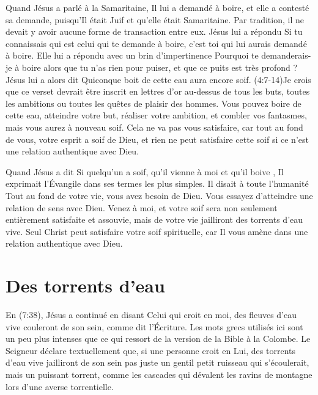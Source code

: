 Quand Jésus a parlé à la Samaritaine, Il lui a demandé à boire,
 et elle a contesté sa demande, puisqu'Il était Juif
 et qu'elle était Samaritaine. Par tradition, il ne devait y avoir
 aucune forme de transaction entre eux. Jésus lui a répondu\frcolon{}
 \Og Si tu connaissais qui est celui qui te demande à boire,
 c'est toi qui lui aurais demandé à boire. \Fg{}
 Elle lui a répondu avec un brin d'impertinence\frcolon{}
 \Og Pourquoi te demanderais-je à boire alors que tu n'as rien pour puiser,
 et que ce puits est très profond ? \Fg{} Jésus lui a alors dit\frcolon{}
 \Og Quiconque boit de cette eau aura encore soif. \Fg{}
 (4:7-14)Je crois que ce verset devrait être inscrit
 en lettres d'or au-dessus de tous les buts, toutes les
 ambitions ou toutes les quêtes de plaisir des hommes.
 Vous pouvez boire de cette eau, atteindre votre but, réaliser votre ambition,
 et combler vos fantasmes, mais vous aurez à nouveau soif.
 Cela ne va pas vous satisfaire, car tout au fond de vous,
 votre esprit a soif de Dieu, et rien ne peut satisfaire cette soif
 si ce n'est une relation authentique avec Dieu.

Quand Jésus a dit\frcolon{} \Og Si quelqu'un a soif, qu'il vienne à moi
 et qu'il boive \Fg{}, Il exprimait l'Évangile dans ses termes
 les plus simples. Il disait à toute l'humanité\frcolon{}
 \Og Tout au fond de votre vie, vous avez besoin de Dieu.
 Vous essayez d'atteindre une relation de sens avec Dieu.
 Venez à moi, et votre soif sera non seulement entièrement satisfaite
 et assouvie, mais de votre vie jailliront des torrents d'eau vive. \Fg{}
 Seul Christ peut satisfaire votre soif spirituelle,
 car Il vous amène dans une relation authentique avec Dieu.


\section{Des torrents d'eau}

En (7:38), Jésus a continué en disant\frcolon{}
 \Og Celui qui croit en moi, des fleuves d'eau vive couleront de son sein,
 comme dit l'Écriture. \Fg{}
 Les mots grecs utilisés ici sont un peu plus intenses que ce qui ressort
 de la version de la Bible à la Colombe. Le Seigneur déclare textuellement
 que, si une personne croit en Lui, \Og des torrents d'eau vive jailliront
 de son sein \Fg{} \ocadr pas juste un gentil petit ruisseau qui s'écoulerait,
 mais un puissant torrent, comme les cascades qui dévalent les ravins de montagne
 lors d'une averse torrentielle.

